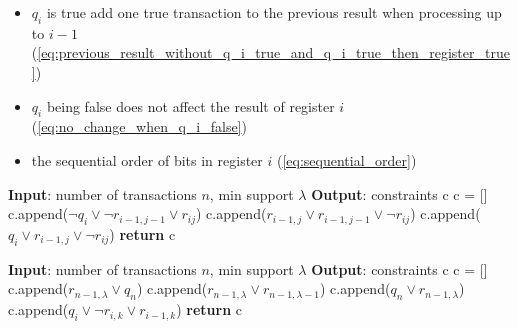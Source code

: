 \begin{itemize}
    \item $q_i$ is true add one true transaction to the previous result when processing up to $i-1$ (\ref{eq:previous_result_without_q_i_true_and_q_i_true_then_register_true})
    \item $q_i$ being false does not affect the result of register $i$ (\ref{eq:no_change_when_q_i_false})
    \item  the sequential order of bits in register $i$ (\ref{eq:sequential_order})
\end{itemize}

\begin{algorithm}
    \begin{algorithmic}[1]
        \State \textbf{Input}: number of transactions $n$, min support $\lambda$
        \State \textbf{Output}: constraints c
        \State c = []
        \State c.append($\neg q_i \vee \neg r_{i-1,j-1} \vee r_{ij}$)
        \State c.append($r_{i-1,j} \vee r_{i-1,j-1} \vee \neg r_{ij}$)
        \EndIf
        \State c.append($q_i \vee r_{i-1,j} \vee \neg r_{ij}$)
        \EndFor
        \EndFor
        \State \textbf{return} c
    \end{algorithmic}
\end{algorithm}

\vspace{15cm}
\begin{algorithm}
    \begin{algorithmic}[1]
        \State \textbf{Input}: number of transactions $n$, min support $\lambda$
        \State \textbf{Output}: constraints c
        \State c = []
        \State c.append($r_{n-1,\lambda} \vee q_n$)
        \State c.append($r_{n-1,\lambda} \vee r_{n-1,\lambda-1}$)
        \State c.append($q_n \vee r_{n-1,\lambda}$)
        \State c.append($q_i \vee \neg r_{i,k} \vee r_{i-1,k}$)
        \EndFor
        \State \textbf{return} c
    \end{algorithmic}
\end{algorithm}